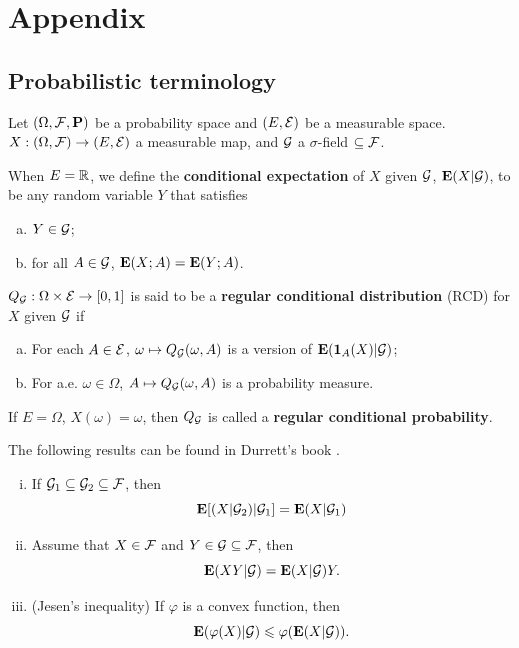\chapter{Appendix}

\section{Probabilistic terminology}
Let $(\Omega, {\mathcal F}, {\mathbf P})$ be a probability space and $(E, {\mathcal E})$ be a measurable space. $X:(\Omega,{\mathcal F})\to (E, {\mathcal E})$ a measurable map, and ${\mathcal G}$ a $\sigma$-field $\subseteq {\mathcal F}$.  
	
When $E={\mathbb R}$, we define the {\bf conditional expectation} of $X$ given ${\mathcal G}$, ${\mathbf E}(X|{\mathcal G})$, to be any random variable $Y$ that satisfies 
\begin{enumerate}[(a)]
    \item $Y\in {\mathcal G}$; 
    \item for all $A\in {\mathcal G}$, ${\mathbf E}(X; A)={\mathbf E}(Y; A)$. 
\end{enumerate}
	
$Q_{{\mathcal G}}: \Omega\times {\mathcal E}\to [0,1]$ is said to be a {\bf {regular conditional distribution}} (RCD) for $X$ given ${\mathcal G}$ if 
\begin{enumerate}[(a)]
    \item For each $A\in {\mathcal E}$, $\omega\mapsto Q_{{\mathcal G}}(\omega, A)$ is a version of ${\mathbf E}({\mathbf{1}}_A(X)|{\mathcal G})$; 
    \item For a.e. $\omega\in \Omega$, $A\mapsto Q_{{\mathcal G}}(\omega, A)$ is a probability measure. 
\end{enumerate}
If $E=\Omega$, $X(\omega)=\omega$, then $Q_{{\mathcal G}}$ is called a {\bf regular conditional probability}. 
	
The following results can be found in Durrett's book \cite{durrett2019probability}.  
\begin{proposition}
    \begin{enumerate}[(i)]
	\item If ${\mathcal G}_1\subseteq {\mathcal G}_2\subseteq {\mathcal F}$, then 
	\begin{equation}
		{\mathbf E}[(X|{\mathcal G}_2)|{\mathcal G}_1]={\mathbf E} (X|{\mathcal G}_1)
	\end{equation}
	\item Assume that $X\in {\mathcal F}$ and $Y\in {\mathcal G}\subseteq {\mathcal F}$, then 
	\begin{equation}
		{\mathbf E} (XY|{\mathcal G})={\mathbf E} (X|{\mathcal G})Y. 
	\end{equation}
	\item (Jesen's inequality) If $\varphi$ is a convex function, then 
	\begin{equation}
		{\mathbf E} (\varphi(X)|{\mathcal G}) \leqslant \varphi({\mathbf E} (X|{\mathcal G})). 
	\end{equation}
    \end{enumerate}
\end{proposition}
	
